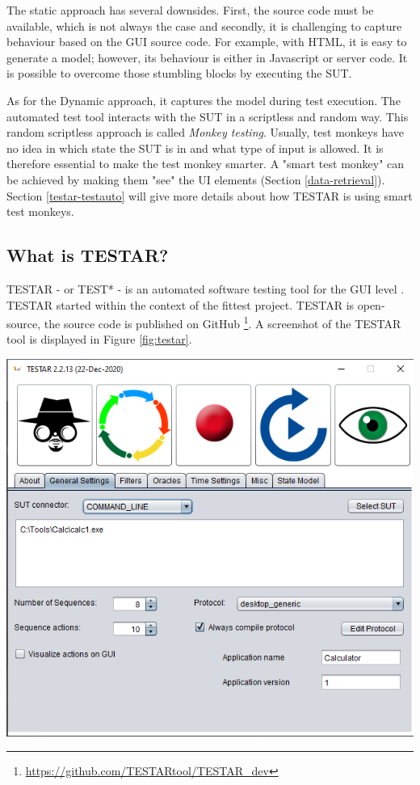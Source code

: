 The static approach has several downsides. First, the source code must be available, which is not always the case and secondly, it is challenging to capture behaviour based on the GUI source code. For example, with HTML, it is easy to generate a model; however, its behaviour is either in Javascript or server code.  It is possible to overcome those stumbling blocks by executing the SUT.
    
As for the Dynamic approach, it captures the model during test execution. The automated test tool interacts with the SUT in a scriptless and random way. This random scriptless approach is called \emph{Monkey testing}. Usually, test monkeys have no idea in which state the SUT is in and what type of input is allowed. It is therefore essential to make the test monkey smarter. A "smart test monkey" can be achieved by making them "see" the UI elements (Section \ref{data-retrieval}). Section \ref{testar-testauto} will give more details about how TESTAR is using smart test monkeys.

\subsection{What is TESTAR?} \label{what-is-testar}
TESTAR - or TEST* - is an automated software testing tool for the GUI level \cite{testar-about}. TESTAR started within the context of the \acrfull{fittest} project. TESTAR is open-source, the source code is published on GitHub \footnote{ \url{https://github.com/TESTARtool/TESTAR\_dev}}. A screenshot of the TESTAR tool is displayed in Figure \ref{fig:testar}.

\bigskip
\begingroup
\captionsetup{type=figure}
\includegraphics[scale=0.5]{images/testar.png}
\label{fig:testar}
\endgroup

